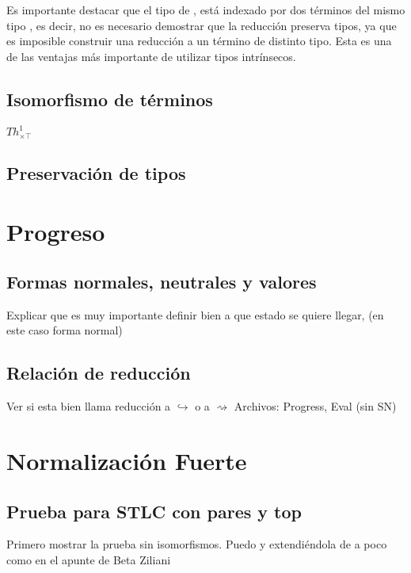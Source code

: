 \documentclass[]{report}
\begin{document}
	Es importante destacar que el tipo de \AgdaDatatype{$\_\hookrightarrow\_$}, está indexado por dos términos del mismo tipo , es decir, no es necesario demostrar que la reducción preserva tipos, ya que es imposible construir una reducción a un término de distinto tipo.
	Esta es una de las ventajas más importante de utilizar tipos intrínsecos.
	
	
	\subsection{Isomorfismo de términos}
	
	$Th^1_{\times\top}$
	
	
	
	
	
	\subsection{Preservación de tipos}
	
	\section{Progreso}
	
	\subsection{Formas normales, neutrales y valores}
	Explicar que es muy importante definir bien a que estado se quiere llegar, (en este caso forma normal)
	
	
	\subsection{Relación de reducción}
	Ver si esta bien llama reducción a $\hookrightarrow$ o a $\rightsquigarrow$
	Archivos: Progress, Eval (sin SN)
	
	\section{Normalización Fuerte}
	
	\subsection{Prueba para STLC con pares y top}
	Primero mostrar la prueba sin isomorfismos. Puedo y extendiéndola de a poco como en el apunte de Beta Ziliani
\end{document}
